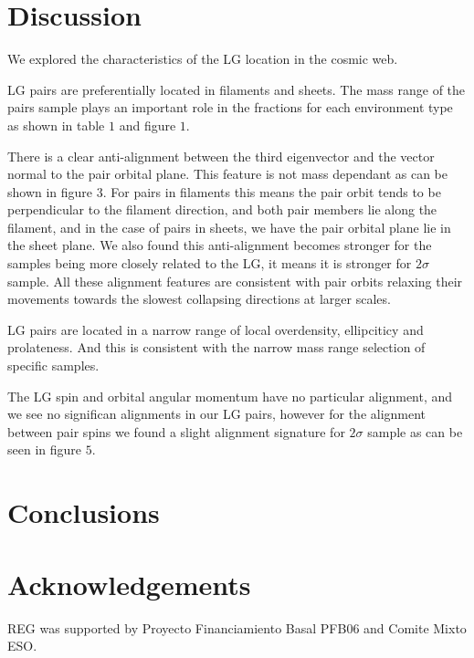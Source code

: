 \documentclass{emulateapj}
\begin{document}
\section{Discussion}
\label{sec:discussion}

We explored the characteristics of the LG location in the cosmic web.

LG pairs are preferentially located in filaments and sheets. The mass range
of the pairs sample plays an important role in the fractions for each environment
type as shown in table $1$ and figure $1$.

There is a clear anti-alignment between the third eigenvector and the vector normal 
to the pair orbital plane. This feature is not mass dependant as can be shown in
figure $3$.
For pairs in filaments this means the pair orbit tends to be perpendicular to the 
filament direction, and both pair members lie along the filament, and in the case 
of pairs in sheets, we have the pair orbital plane lie in the sheet plane.
We also found this anti-alignment becomes stronger for the samples being more 
closely related to the LG, it means it is stronger for $2\sigma$ sample.
All these alignment features are consistent with pair orbits relaxing their 
movements towards the slowest collapsing directions at larger scales.

LG pairs are located in a narrow range of local overdensity, ellipciticy and prolateness.
And this is consistent with the narrow mass range selection of specific samples.

The LG spin and orbital angular momentum have no particular alignment,
and we see no significan alignments in our LG pairs, however for the alignment
between pair spins we found a slight alignment signature for $2\sigma$ sample as
can be seen in figure $5$.

\section{Conclusions}
\label{sec:conclusions}


\section*{Acknowledgements}
REG was supported by Proyecto Financiamiento Basal PFB06 and Comite Mixto ESO.


 
\end{document}
